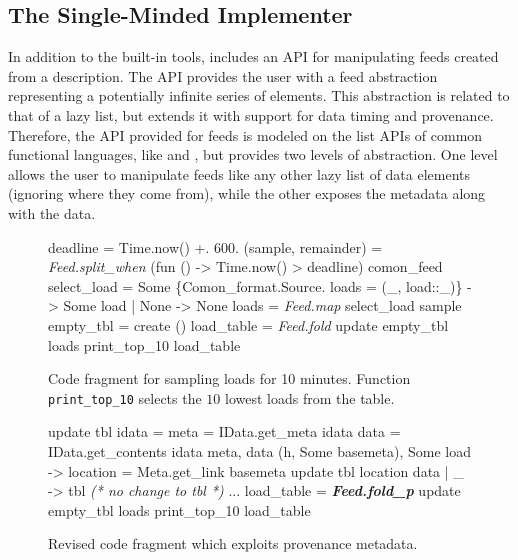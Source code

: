 

\subsection{The Single-Minded Implementer}

In addition to the built-in tools, \padsd{} includes an API for manipulating feeds created from a description. The API provides the user with a feed abstraction representing a potentially infinite series of elements. This abstraction is related to that of a lazy list, but extends it with support for data timing and provenance. Therefore, the API provided for feeds is modeled on the list APIs of common functional languages, like \ocaml and \haskell, but provides two levels of abstraction. One level allows the user to manipulate feeds like any other lazy list of data elements (ignoring where they come from), while the other exposes the metadata along with the data.


\begin{figure}[tb]
\begin{codebox}
 deadline = Time.now() +. 600. 
 (sample, remainder) = \textit{Feed.split_when} 
   (fun () -> Time.now() > deadline) comon_feed 
 select_load = 
    Some \{Comon_format.Source.
          loads = (_, load::_)\} -> Some load
  | None -> None 
 loads = \textit{Feed.map} select_load sample 
 empty_tbl = create () 
 load_table = \textit{Feed.fold} update empty_tbl loads 
 print_top_10 load_table
\end{codebox}
  \caption{Code fragment for sampling \planetlab loads for 10 minutes. Function
  \texttt{print\_top\_10} selects the $10$ lowest loads from the table.}
\label{fig:sample-loads}
\end{figure}

\begin{figure}[tb]

\begin{codebox}
 update tbl idata =
   meta = IData.get_meta idata 
   data = IData.get_contents idata 
   meta, data  
    (h, Some basemeta), Some load ->
       location = Meta.get_link basemeta 
      update tbl location data
  | _ -> tbl \textit{ (* no change to tbl *)}
 ...
 load_table = \textit{\textbf{Feed.fold_p}} update empty_tbl loads
 print_top_10 load_table
\end{codebox}
  \caption{Revised code fragment which exploits provenance metadata. }
\label{fig:sample-loads-prov}
\end{figure}

